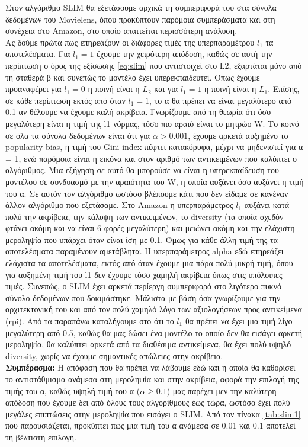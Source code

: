 Στον αλγόριθμο SLIM  θα εξετάσουμε αρχικά τη συμπεριφορά του στα σύνολα δεδομένων του Movielens, όπου προκύπτουν παρόμοια συμπεράσματα και στη συνέχεια στο Amazon, στο οποίο απαιτείται περισσότερη ανάλυση.\\ Ας δούμε πρώτα πως επηρεάζουν οι διάφορες τιμές της υπερπαραμέτρου $l_1$ τα αποτελέσματα. Για $ l_1 = 1 $ έχουμε την χειρότερη απόδοση, καθώς σε αυτή την περίπτωση ο όρος της εξίσωσης \eqref{eq:slim} που αντιστοιχεί στο L2, εξαρτάται μόνο από τη σταθερά β και συνεπώς το μοντέλο έχει υπερεκπαιδευτεί. Όπως έχουμε προαναφέρει για $ l_1 = 0 $ η ποινή είναι η $ L_2 $ και για $ l_1 = 1 $ η ποινή είναι η $ L_1 $.  Επίσης, σε κάθε περίπτωση εκτός από όταν $ l_1 = 1 $, το α θα πρέπει να είναι μεγαλύτερο από 0.1 αν θέλουμε να έχουμε καλή ακρίβεια. Γνωρίζουμε από τη θεωρία ότι όσο μεγαλύτερη είναι η τιμή της l1 νόρμας, τόσο πιο αραιό είναι το μητρώο W. Το κοινό σε όλα τα σύνολα δεδομένων είναι ότι για $ α>0.001 $, έχουμε αρκετά αυξημένο το popularity bias, η τιμή του Gini index πέφτει κατακόρυφα, μέχρι να μηδενιστεί για α = 1, ενώ παρόμοια είναι η εικόνα και στον αριθμό των αντικειμένων που καλύπτει ο αλγόριθμος. Μια εξήγηση σε αυτό θα μπορούσε να είναι η υπερεκπαίδευση του μοντέλου σε συνδυασμό με την αραιότητα του W, η οποία αυξάνει όσο αυξάνει η τιμή του α. Σε αυτόν τον αλγόριθμο ωστόσο βλέπουμε κάτι που δεν είδαμε σε κανέναν άλλον αλγόριθμο που εξετάσαμε. Στο Amazon η υπερπαράμετρος $ l_1 $ αυξάνει κατά πολύ την ακρίβεια, την κάλυψη των αντικειμένων, το diversity (τα οποία σχεδόν φτάνει ακόμη και να είναι 6 φορές μεγαλύτερη) και μειώνει ακόμη και την ελάχιστη μεροληψία που υπάρχει όταν είναι ίση με 0.1. Όμως για κάθε άλλη τιμή της τα αποτελέσματα παραμένουν αμετάβλητα. Η υπερπαράμετρος alpha εδώ επηρεάζει ελάχιστα τα αποτελέσματα, εκτός από όταν έχουμε μια πάρα πολύ μικρή τιμή, όπου για αυξημένη τιμή του l1 δεν έχουμε τόσο χαμηλή ακρίβεια όπως στις υπόλοιπες τιμές. Συνεπώς, ο SLIM έχει αρκετά περίεργη συμπεριφορά στο λιγότερο πυκνό σύνολο δεδομένων που δοκιμάστηκε. Μάλιστα με βάση όσα γνωρίζουμε για την αρχιτεκτονική του και από τον πολύ χαμηλό λόγο των αξιολογήσεων προς αντικείμενα (rpi).
Από τα παραπάνω καταλήγουμε στο ότι το $ l_1 $ θα πρέπει να έχει μια τιμή λίγο μεγαλύτερη από 0.5, καθώς θα μας δώσει ένα μοντέλο το οποίο δεν θα εισάγει αρκετή μεροληψία, θα καλύπτει αρκετά από τα διαθέσιμα αντικείμενα, θα έχει πολύ υψηλό diversity, χωρίς να έχουμε σημαντικές απώλειες στην ακρίβεια.\\
\textbf{Συμπέρασμα:} Η απόφαση που θα πρέπει να λάβουμε εδώ και η οποία θα καθορίσει το αντιστάθμισμα ανάμεσα στη μεροληψία και στην ακρίβεια, αφορά την επιλογή της τιμής του α, καθώς υψηλή τιμή του α ($ α \geq 0.1 $) μας παρέχει μεν την καλύτερη απόδοση που έχουμε δει από όλους τους αλγορίθμους έως τώρα, ωστόσο έχει πολύ μεγάλες επιπτώσεις στην μεροληψία που εισάγει ο SLIM. Από τον πίνακα \ref{tab:slim1} που παρουσιάζεται, προκύπτει πως μια τιμή του α ανάμεσα σε 0.01 και 0.1 αποτελεί τη βέλτιστη επιλογή.
